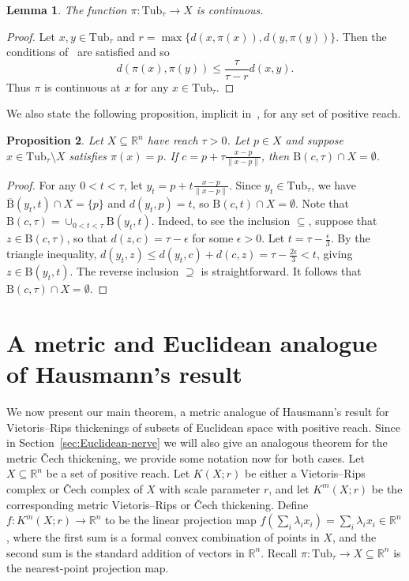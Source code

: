 \documentclass{amsart}
\theoremstyle{plain}
\newtheorem{lemma}{Lemma}[section]
\newtheorem{proposition}[lemma]{Proposition}
\theoremstyle{definition}
\theoremstyle{myremark}
\newcommand{\R}{\mathbb{R}}
\newcommand{\ball}[2]{\mathrm{B}(#1,#2)}
\newcommand{\cball}[2]{\overline{\mathrm{B}}(#1,#2)}
\newcommand{\Tub}{\mathrm{Tub}}
\begin{document}
\begin{lemma}\label{lem:pi-continuous}
The function $\pi \colon \Tub_{\tau} \to X$ is continuous.
\end{lemma}

\begin{proof}
Let $x,y \in \Tub_{\tau}$ and $r = \max\{d(x,\pi(x)),d(y,\pi(y))\}$.
Then the conditions of~\cite[Theorem~4.8(8)]{FedererCurvature} are satisfied and so
\begin{equation}
d(\pi(x),\pi(y)) \leq \frac{\tau}{\tau - r} d(x,y).
\end{equation}
Thus $\pi$ is continuous at $x$ for any $x \in \Tub_{\tau}$.
\end{proof}

We also state the following proposition, implicit in~\cite{NiyogiSmaleWeinberger}, for any set of positive reach.

\begin{proposition}\label{prop:empty-ball}
Let $X \subseteq\R^n$ have reach $\tau > 0$.
Let $p \in X$ and suppose $x\in\Tub_\tau\setminus X$ satisfies $\pi(x)=p$.
If $c=p+\tau\frac{x-p}{\|x-p\|}$, then $\ball{c}{\tau} \cap X = \emptyset$.
\end{proposition}

\begin{proof}
For any $0 < t < \tau$, let $y_t = p + t\frac{x-p}{\|x-p\|}$.
Since $y_t \in \Tub_\tau$, we have $\cball{y_t}{t} \cap X = \{p\}$ and $d(y_t,p) = t$, so $\ball{c}{t} \cap X = \emptyset$.
Note that $\ball{c}{\tau} = \cup_{0 < t < \tau} \ball{y_t}{t}$. Indeed, to see the inclusion $\subseteq$, suppose that $z \in \ball{c}{\tau}$, so that $d(z,c) = \tau - \epsilon$ for some $\epsilon > 0$.
Let $t = \tau - \frac{\epsilon}{3}$.
By the triangle inequality, $d(y_t,z) \le d(y_t,c) + d(c,z) = \tau - \frac{2 \epsilon}{3} < t$, giving $z\in \ball{y_t}{t}$.
The reverse inclusion $\supseteq$ is straightforward.
It follows that $\ball{c}{\tau} \cap X = \emptyset$.
\end{proof}


\section{A metric and Euclidean analogue of Hausmann's result}\label{sec:Euclidean-Hausmann}

We now present our main theorem, a metric analogue of Hausmann's result for Vietoris--Rips thickenings of subsets of Euclidean space with positive reach.
Since in Section~\ref{sec:Euclidean-nerve} we will also give an analogous theorem for the metric \v{C}ech thickening, we provide some notation now for both cases.
Let $X \subseteq \R^n$ be a set of positive reach.
Let $K(X;r)$ be either a Vietoris--Rips complex or \v{C}ech complex of $X$ with scale parameter $r$, and let $K^m(X;r)$ be the corresponding metric Vietoris--Rips or \v{C}ech thickening.
Define $f\colon K^m(X;r) \rightarrow \R^n$ to be the linear projection map $f\left( \sum_{i} \lambda_i x_i \right) = \sum_{i} \lambda_i x_i \in \R^n$, where the first sum is a formal convex combination of points in $X$, and the second sum is the standard addition of vectors in $\R^n$.
Recall $\pi \colon \Tub_{\tau} \to X \subseteq \R^n$ is the nearest-point projection map.
\end{document}

